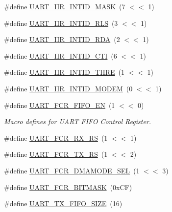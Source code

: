 \begin{DoxyCompactItemize}
\item 
\#define \hyperlink{group__UART__17XX__40XX_ga6f78952aec5835ac753718323b681910}{U\-A\-R\-T\-\_\-\-I\-I\-R\-\_\-\-I\-N\-T\-I\-D\-\_\-\-M\-A\-S\-K}~(7 $<$$<$ 1)
\item 
\#define \hyperlink{group__UART__17XX__40XX_ga4441660d2a99f6b17a79eafbfb0424dd}{U\-A\-R\-T\-\_\-\-I\-I\-R\-\_\-\-I\-N\-T\-I\-D\-\_\-\-R\-L\-S}~(3 $<$$<$ 1)
\item 
\#define \hyperlink{group__UART__17XX__40XX_gac646d8f797f3e71e01f4361997fc581b}{U\-A\-R\-T\-\_\-\-I\-I\-R\-\_\-\-I\-N\-T\-I\-D\-\_\-\-R\-D\-A}~(2 $<$$<$ 1)
\item 
\#define \hyperlink{group__UART__17XX__40XX_ga965ba229214955385f11277549b7ecce}{U\-A\-R\-T\-\_\-\-I\-I\-R\-\_\-\-I\-N\-T\-I\-D\-\_\-\-C\-T\-I}~(6 $<$$<$ 1)
\item 
\#define \hyperlink{group__UART__17XX__40XX_gafb93160677afbc9c90f7a0baa917a435}{U\-A\-R\-T\-\_\-\-I\-I\-R\-\_\-\-I\-N\-T\-I\-D\-\_\-\-T\-H\-R\-E}~(1 $<$$<$ 1)
\item 
\#define \hyperlink{group__UART__17XX__40XX_gaf02dabd5f0b60345c70379ab8df3e899}{U\-A\-R\-T\-\_\-\-I\-I\-R\-\_\-\-I\-N\-T\-I\-D\-\_\-\-M\-O\-D\-E\-M}~(0 $<$$<$ 1)
\item 
\#define \hyperlink{group__UART__17XX__40XX_gadec12ecfc7ae1198cee68f2cad982bcb}{U\-A\-R\-T\-\_\-\-F\-C\-R\-\_\-\-F\-I\-F\-O\-\_\-\-E\-N}~(1 $<$$<$ 0)
\begin{DoxyCompactList}\small\item\em Macro defines for U\-A\-R\-T F\-I\-F\-O Control Register. \end{DoxyCompactList}\item 
\#define \hyperlink{group__UART__17XX__40XX_ga246b37ccd6137c0bb51eb32760cb228e}{U\-A\-R\-T\-\_\-\-F\-C\-R\-\_\-\-R\-X\-\_\-\-R\-S}~(1 $<$$<$ 1)
\item 
\#define \hyperlink{group__UART__17XX__40XX_ga1c1a83fcacf333309330eea460d8a6a6}{U\-A\-R\-T\-\_\-\-F\-C\-R\-\_\-\-T\-X\-\_\-\-R\-S}~(1 $<$$<$ 2)
\item 
\#define \hyperlink{group__UART__17XX__40XX_ga996e144f7d08cb36aa729f28d74b5801}{U\-A\-R\-T\-\_\-\-F\-C\-R\-\_\-\-D\-M\-A\-M\-O\-D\-E\-\_\-\-S\-E\-L}~(1 $<$$<$ 3)
\item 
\#define \hyperlink{group__UART__17XX__40XX_ga2dd6b12c7c237b0a52c6a82698f85b04}{U\-A\-R\-T\-\_\-\-F\-C\-R\-\_\-\-B\-I\-T\-M\-A\-S\-K}~(0x\-C\-F)
\item 
\#define \hyperlink{group__UART__17XX__40XX_ga94b76465adbb4fb96c821ef0866cbd0f}{U\-A\-R\-T\-\_\-\-T\-X\-\_\-\-F\-I\-F\-O\-\_\-\-S\-I\-Z\-E}~(16)

\end{DoxyCompactItemize}
